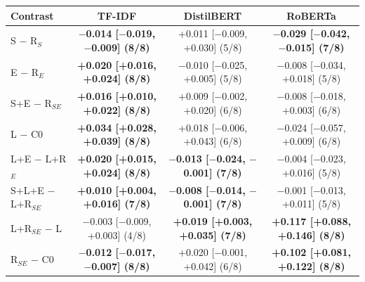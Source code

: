 \begin{tabular}{@{}lccc@{}}
\toprule
Contrast & TF-IDF & DistilBERT & RoBERTa \\
\midrule
S $-$ R$_S$ & \textbf{$-$0.014 [$-$0.019, $-$0.009] (8/8)} & +0.011 [$-$0.009, +0.030] (5/8) & \textbf{$-$0.029 [$-$0.042, $-$0.015] (7/8)} \\
E $-$ R$_E$ & \textbf{+0.020 [+0.016, +0.024] (8/8)} & $-$0.010 [$-$0.025, +0.005] (5/8) & $-$0.008 [$-$0.034, +0.018] (5/8) \\
S+E $-$ R$_{SE}$ & \textbf{+0.016 [+0.010, +0.022] (8/8)} & +0.009 [$-$0.002, +0.020] (6/8) & $-$0.008 [$-$0.018, +0.003] (6/8) \\
L $-$ C0 & \textbf{+0.034 [+0.028, +0.039] (8/8)} & +0.018 [$-$0.006, +0.043] (6/8) & $-$0.024 [$-$0.057, +0.009] (6/8) \\
L+E $-$ L+R$_E$ & \textbf{+0.020 [+0.015, +0.024] (8/8)} & \textbf{$-$0.013 [$-$0.024, $-$0.001] (7/8)} & $-$0.004 [$-$0.023, +0.016] (5/8) \\
S+L+E $-$ L+R$_{SE}$ & \textbf{+0.010 [+0.004, +0.016] (7/8)} & \textbf{$-$0.008 [$-$0.014, $-$0.001] (7/8)} & $-$0.001 [$-$0.013, +0.011] (5/8) \\
\midrule
L+R$_{SE}$ $-$ L & $-$0.003 [$-$0.009, +0.003] (4/8) & \textbf{+0.019 [+0.003, +0.035] (7/8)} & \textbf{+0.117 [+0.088, +0.146] (8/8)} \\
R$_{SE}$ $-$ C0 & \textbf{$-$0.012 [$-$0.017, $-$0.007] (8/8)} & +0.020 [$-$0.001, +0.042] (6/8) & \textbf{+0.102 [+0.081, +0.122] (8/8)} \\
\bottomrule
\end{tabular}

